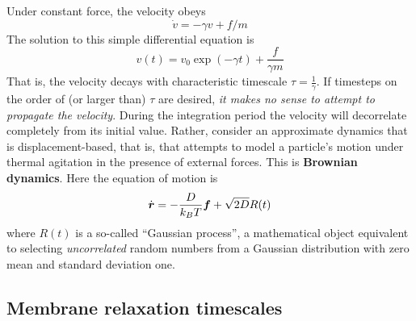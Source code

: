 Under constant force, the velocity obeys
\begin{equation}
\dot{v} = -\gamma v + f/m
\end{equation}
The solution to this simple differential equation is
\begin{equation}
v(t) = v_0 \exp(-\gamma t) + \frac{f}{\gamma m}
\end{equation}
That is, the velocity decays with characteristic timescale $\tau=\frac{1}{\gamma}$.
If timesteps on the order of (or larger than) $\tau$ are desired, {\it it makes no sense to attempt to propagate the velocity}.
During the integration period the velocity will decorrelate completely from its initial value.
Rather, consider an approximate dynamics that is displacement-based, that is, that attempts to model a particle's motion under thermal agitation in the presence of external forces.
This is {\bf Brownian dynamics}. 
Here the equation of motion is 
\begin{equation}
\dot{\boldsymbol{r}} = -\frac{D}{k_B T} \boldsymbol{f} + \sqrt{2 D} R(t)
\end{equation}
where $R(t)$ is a so-called ``Gaussian process'', a mathematical object equivalent to selecting {\it uncorrelated} random numbers from a Gaussian distribution with zero mean and standard deviation one.

\subsection{Membrane relaxation timescales}




